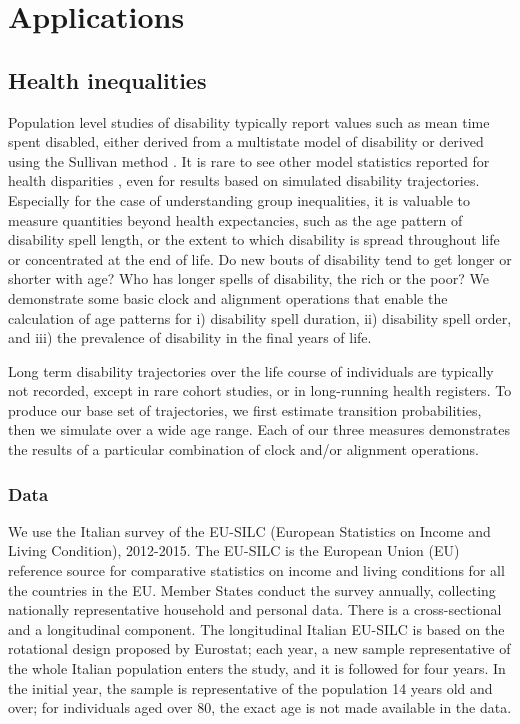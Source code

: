 \documentclass[a4paper,left=1.25cm,right=1.25cm,top=1.25cm,bottom=1.25cm]{article}
\begin{document}
\section{Applications}

\subsection{Health inequalities}
Population level studies of disability typically report values such as mean time spent disabled, either derived from a multistate model of disability \citep{crimmins2009change} or derived using the Sullivan method \citep{Sullivan1970,Crimmins1997}. It is rare to see other model statistics reported for health disparities \citep{laditka1998new}, even for results based on simulated disability trajectories. Especially for the case of understanding group inequalities, it is valuable to measure quantities beyond health expectancies, such as the age pattern of disability spell length, or the extent to which disability is spread throughout life or concentrated at the end of life. Do new bouts of disability tend to get longer or shorter with age? Who has longer spells of disability, the rich or the poor? We demonstrate some basic clock and alignment operations that enable the calculation of age patterns for i) disability spell duration, ii) disability spell order, and iii) the prevalence of disability in the final years of life.

Long term disability trajectories over the life course of individuals are typically not recorded, except in rare cohort studies, or in long-running health registers. To produce our base set of trajectories, we first estimate transition probabilities, then we simulate over a wide age range. Each of our three measures demonstrates the results of a particular combination of clock and/or alignment operations.

\subsubsection{Data}
We use the Italian survey of the EU-SILC (European Statistics on Income and Living Condition), 2012-2015. The EU-SILC is the European Union (EU) reference source for comparative statistics on income and living conditions for all the countries in the EU. Member States conduct the survey annually, collecting nationally representative household and personal data. There is a cross-sectional and a longitudinal component. The longitudinal Italian EU-SILC is based on the rotational design proposed by Eurostat; each year, a new sample representative of the whole Italian population enters the study, and it is followed for four years. In the initial year, the sample is representative of the population 14 years old and over; for individuals aged over 80, the exact age is not made available in the data.
\end{document}
